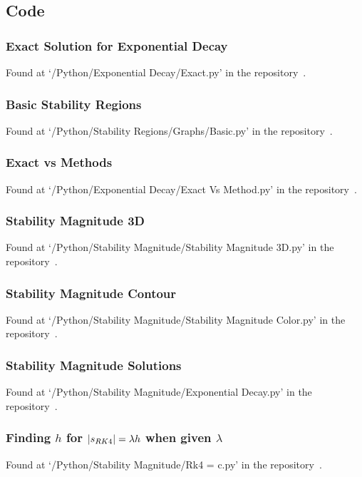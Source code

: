 \subsection{Code}
\subsubsection{Exact Solution for Exponential Decay}
Found at `/Python/Exponential Decay/Exact.py' in the repository~\cite{GitHub_Repo}.

\newpage
\subsubsection{Basic Stability Regions}
Found at `/Python/Stability Regions/Graphs/Basic.py' in the repository~\cite{GitHub_Repo}.

\newpage
\subsubsection{Exact vs Methods}
Found at `/Python/Exponential Decay/Exact Vs Method.py' in the repository~\cite{GitHub_Repo}.

\newpage
\subsubsection{Stability Magnitude 3D}
Found at `/Python/Stability Magnitude/Stability Magnitude 3D.py' in the repository~\cite{GitHub_Repo}.

\newpage
\subsubsection{Stability Magnitude Contour}
Found at `/Python/Stability Magnitude/Stability Magnitude Color.py' in the repository~\cite{GitHub_Repo}.

\newpage
\subsubsection{Stability Magnitude Solutions}
Found at `/Python/Stability Magnitude/Exponential Decay.py' in the repository~\cite{GitHub_Repo}.

\newpage
\subsubsection{Finding $h$ for $|s_{RK4}| = \lambda h$ when given $\lambda$}
Found at `/Python/Stability Magnitude/Rk4 = c.py' in the repository~\cite{GitHub_Repo}.

\newpage

